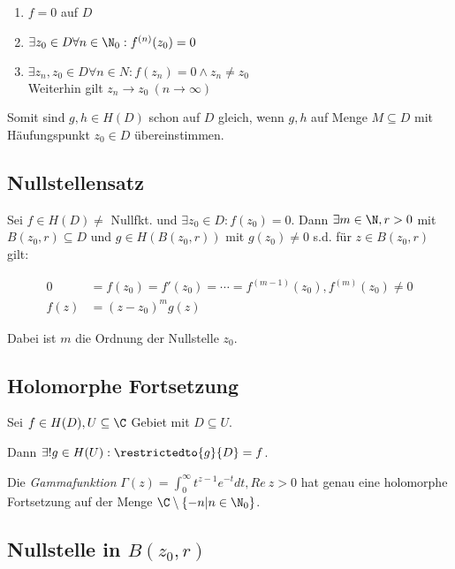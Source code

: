 \begin{enumerate}[label=(\alph*)]
	\item \(f = 0\) auf \(D\)
	\item \(\exists z_0 \in D \forall n \in \N_0 : f^{(n)}(z_0) = 0\)
	\item \(\exists z_n, z_0 \in D \forall n \in N : f(z_n) = 0 \land z_n \neq z_0\) \\ Weiterhin gilt \(z_n \to z_0 \ (n \to \infty)\)
\end{enumerate}

Somit sind \(g, h \in H(D)\) schon auf \(D\) gleich, wenn \(g, h\) auf Menge \(M \subseteq D\) mit Häufungspunkt \(z_0 \in D\) übereinstimmen.

\subsection*{Nullstellensatz}

Sei \(f \in H(D) \neq\) Nullfkt. und \(\exists z_0 \in D : f(z_0) = 0\). Dann \(\exists m \in \N, r > 0\) mit \(B(z_0, r) \subseteq D\) und \(g \in H(B(z_0,r))\) mit \(g(z_0) \neq 0\) s.d. für \(z \in B(z_0,r)\) gilt:

\vspace{-4mm}
\begin{align*}
0 &= f(z_0) = f'(z_0) = \cdots = f^{(m-1)}(z_0), f^{(m)}(z_0) \neq 0 \\
f(z) &= (z-z_0)^m g(z)
\end{align*}

Dabei ist \(m\) die Ordnung der Nullstelle \(z_0\).

\subsection*{Holomorphe Fortsetzung}

Sei \(f \in H(D), U \subseteq \C\) Gebiet mit \(D \subseteq U\).

Dann \(\exists! g \in H(U) : \restrictedto{g}{D} = f\).

\spacing

Die \emph{Gammafunktion} \(\Gamma(z) = \int_0^\infty t^{z-1}e^{-t} dt, Re \ z > 0\) hat genau eine holomorphe Fortsetzung auf der Menge \(\C \setminus \{ -n | n \in \N_0 \}\).

\subsection*{Nullstelle in \(B(z_0,r)\)}

